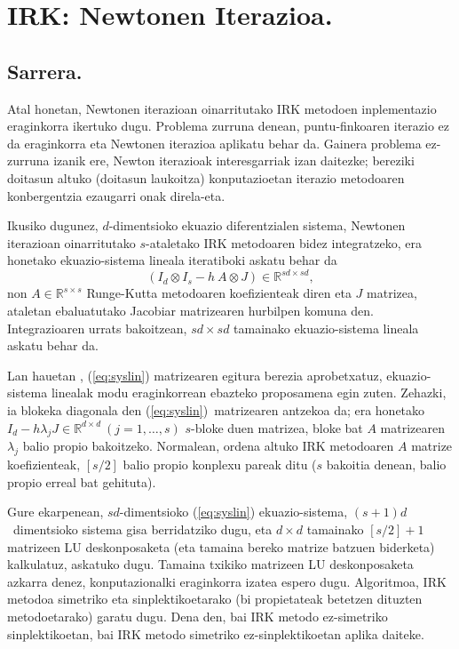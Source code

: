 \chapter{IRK: Newtonen Iterazioa.}


\section{Sarrera.}


Atal honetan, Newtonen iterazioan oinarritutako IRK metodoen inplementazio eraginkorra ikertuko dugu.
Problema zurruna denean, puntu-finkoaren iterazio ez da eraginkorra eta Newtonen iterazioa aplikatu behar da. Gainera problema ez-zurruna izanik ere, Newton iterazioak interesgarriak izan daitezke; bereziki doitasun altuko (doitasun laukoitza) konputazioetan iterazio metodoaren konbergentzia ezaugarri onak direla-eta. 

Ikusiko dugunez, $d$-dimentsioko ekuazio diferentzialen sistema, Newtonen iterazioan oinarritutako $s$-ataletako IRK metodoaren bidez integratzeko, era honetako ekuazio-sistema lineala iteratiboki askatu behar da
\begin{equation}
\label{eq:syslin}
(I_d \otimes I_s- h \ A \otimes J) \in \mathbb{R}^{sd \times sd},
\end{equation} 
non $A \in \mathbb{R}^{s \times s}$ Runge-Kutta metodoaren koefizienteak diren eta $J$ matrizea, ataletan ebaluatutako Jacobiar matrizearen hurbilpen komuna den. Integrazioaren urrats bakoitzean, $sd \times sd$ tamainako ekuazio-sistema lineala askatu behar da.

Lan hauetan \cite{Butcher1976,Liniger1970,Bickart1977} , (\ref{eq:syslin}) matrizearen egitura berezia aprobetxatuz, ekuazio-sistema linealak modu eraginkorrean ebazteko proposamena egin zuten. Zehazki, ia blokeka diagonala den (\ref{eq:syslin})~matrizearen antzekoa da;  era honetako $I_d-h \lambda_j J \in \mathbb{R}^{d \times d} \ (j=1,\dots,s)$ $s$-bloke duen matrizea, bloke bat $A$ matrizearen $\lambda_j$ balio propio  bakoitzeko. Normalean, ordena altuko IRK metodoaren $A$ matrize koefizienteak, $[s/2]$ balio propio  konplexu pareak ditu ($s$ bakoitia denean, balio propio erreal bat gehituta).

Gure ekarpenean, $sd$-dimentsioko (\ref{eq:syslin}) ekuazio-sistema, $(s+1)d$~dimentsioko sistema gisa 
berridatziko dugu, eta $d \times d$ tamainako $[s/2]+1$ matrizeen LU deskonposaketa (eta tamaina bereko matrize batzuen biderketa) kalkulatuz, askatuko dugu. Tamaina txikiko matrizeen LU deskonposaketa azkarra denez, konputazionalki eraginkorra izatea espero dugu. Algoritmoa, IRK metodoa simetriko eta sinplektikoetarako (bi propietateak betetzen dituzten metodoetarako) garatu dugu. Dena den, bai IRK metodo ez-simetriko sinplektikoetan, bai IRK metodo simetriko ez-sinplektikoetan aplika daiteke.
 
